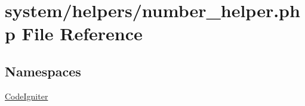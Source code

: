\hypertarget{number__helper_8php}{\section{system/helpers/number\-\_\-helper.php File Reference}
\label{number__helper_8php}
}
\subsection*{Namespaces}
\begin{DoxyCompactItemize}
\item 
\hyperlink{namespace_code_igniter}{Code\-Igniter}
\end{DoxyCompactItemize}
